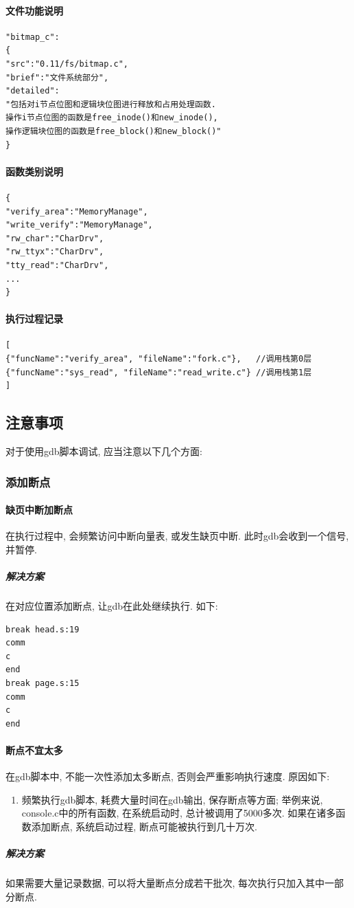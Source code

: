 \documentclass{ctexart}
\begin{document}
\paragraph{文件功能说明}
\begin{lstlisting}[language=HTML]
"bitmap_c":
{
"src":"0.11/fs/bitmap.c",
"brief":"文件系统部分",
"detailed":
"包括对i节点位图和逻辑块位图进行释放和占用处理函数. 
操作i节点位图的函数是free_inode()和new_inode(), 
操作逻辑块位图的函数是free_block()和new_block()"
}
\end{lstlisting}

\paragraph{函数类别说明}
\begin{lstlisting}
{
"verify_area":"MemoryManage",
"write_verify":"MemoryManage",
"rw_char":"CharDrv",
"rw_ttyx":"CharDrv",
"tty_read":"CharDrv",
...
}
\end{lstlisting}
\paragraph{执行过程记录}
\begin{lstlisting}
[
{"funcName":"verify_area", "fileName":"fork.c"},   //调用栈第0层
{"funcName":"sys_read", "fileName":"read_write.c"} //调用栈第1层
]
\end{lstlisting}
\subsection{注意事项}
对于使用gdb脚本调试, 应当注意以下几个方面:
\subsubsection{添加断点}
\paragraph{缺页中断加断点}
在执行过程中, 会频繁访问中断向量表, 或发生缺页中断. 此时gdb会收到一个信号, 并暂停.

\subparagraph{解决方案}
在对应位置添加断点, 让gdb在此处继续执行. 如下:
\begin{lstlisting}
break head.s:19
comm
c
end
break page.s:15
comm
c
end
\end{lstlisting}

\paragraph{断点不宜太多}在gdb脚本中, 不能一次性添加太多断点, 否则会严重影响执行速度. 原因如下:
\begin{enumerate}
	\item 频繁执行gdb脚本, 耗费大量时间在gdb输出, 保存断点等方面;
	\subitem 举例来说, console.c中的所有函数, 在系统启动时, 总计被调用了5000多次.
	\subitem 如果在诸多函数添加断点, 系统启动过程, 断点可能被执行到几十万次.
\end{enumerate}
\subparagraph{解决方案}
如果需要大量记录数据, 可以将大量断点分成若干批次, 每次执行只加入其中一部分断点. 
\end{document}
